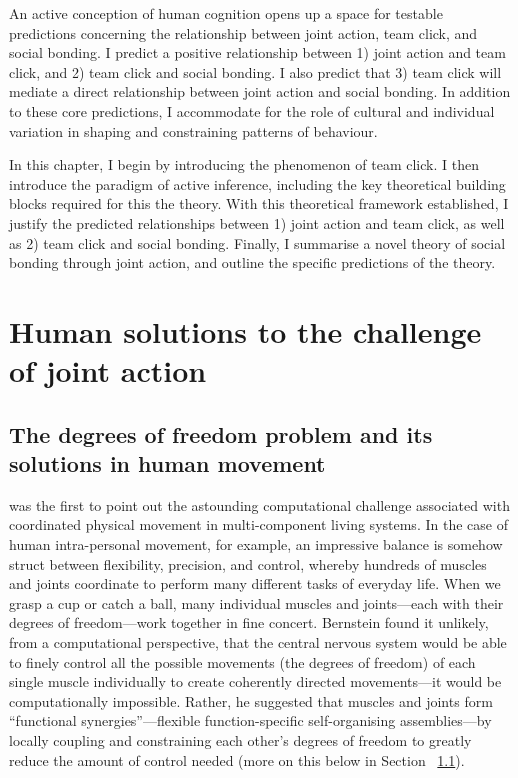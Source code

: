 \begin{CJK}{UTF8}{gbsn}

An active conception of human cognition opens up a space for testable predictions concerning the relationship between joint action, team click, and social bonding.  I predict a positive relationship between 1) joint action and team click, and 2) team click and social bonding.  I also predict that 3) team click will mediate a direct relationship between joint action and social bonding. In addition to these core predictions, I accommodate for the role of cultural and individual variation in shaping and constraining patterns of behaviour.

In this chapter, I begin by introducing the phenomenon of team click.  I then introduce the paradigm of active inference, including the key theoretical building blocks required for this the theory.  With this theoretical framework established, I justify the predicted relationships between 1) joint action and team click, as well as 2) team click and social bonding.  Finally, I summarise a novel theory of social bonding through joint action, and outline the specific predictions of the theory.



\section{Human solutions to the challenge of joint action}
\subsection{The degrees of freedom problem and its solutions in human movement\label{sect:dfProblem}}

\textcite{Bernstein1967} was the first to point out the astounding computational challenge associated with coordinated physical movement in multi-component living systems.  In the case of human intra-personal movement, for example, an impressive balance is somehow struct between flexibility, precision, and control, whereby hundreds of muscles and joints coordinate to perform many different tasks of everyday life.  When we grasp a cup or catch a ball, many individual muscles and joints---each with their degrees of freedom---work together in fine concert.  Bernstein found it unlikely, from a computational perspective, that the central nervous system would be able to finely control all the possible movements (the degrees of freedom) of each single muscle individually to create coherently directed movements---it would be computationally impossible. Rather, he suggested that muscles and joints form  ``functional synergies''---flexible function-specific self-organising assemblies---by locally coupling and constraining each other’s degrees of freedom to greatly reduce the amount of control needed (more on this below in Section ~\ref{}).


\end{CJK}
